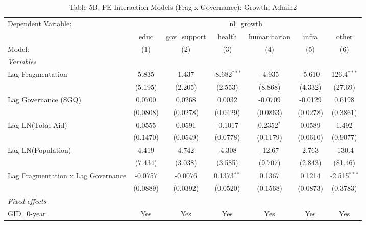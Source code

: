 \begin{table}[H]
   \caption{Table 5B. FE Interaction Models (Frag x Governance): Growth, Admin2}
   \centering
   \begin{tabular}{lcccccc}
      \tabularnewline \midrule \midrule
      Dependent Variable: & \multicolumn{6}{c}{nl\_growth}\\
                                         & educ     & gov\_support  & health         & humanitarian & infra    & other \\   
      Model:                             & (1)      & (2)           & (3)            & (4)          & (5)      & (6)\\  
      \midrule
      \emph{Variables}\\
      Lag Fragmentation                  & 5.835    & 1.437         & -8.682$^{***}$ & -4.935       & -5.610   & 126.4$^{***}$\\   
                                         & (5.195)  & (2.205)       & (2.553)        & (8.868)      & (4.332)  & (27.69)\\   
      Lag Governance (SGQ)               & 0.0700   & 0.0268        & 0.0032         & -0.0709      & -0.0129  & 0.6198\\   
                                         & (0.0808) & (0.0278)      & (0.0429)       & (0.0863)     & (0.0278) & (0.3861)\\   
      Lag LN(Total Aid)                  & 0.0555   & 0.0591        & -0.1017        & 0.2352$^{*}$ & 0.0589   & 1.492\\   
                                         & (0.1470) & (0.0549)      & (0.0778)       & (0.1179)     & (0.0610) & (0.9077)\\   
      Lag LN(Population)                 & 4.419    & 4.742         & -4.308         & -12.67       & 2.763    & -130.4\\   
                                         & (7.434)  & (3.038)       & (3.585)        & (9.707)      & (2.843)  & (81.46)\\   
      Lag Fragmentation x Lag Governance & -0.0757  & -0.0076       & 0.1373$^{**}$  & 0.1367       & 0.1214   & -2.515$^{***}$\\   
                                         & (0.0889) & (0.0392)      & (0.0520)       & (0.1568)     & (0.0873) & (0.3783)\\   
      \midrule
      \emph{Fixed-effects}\\
      GID\_0-year                        & Yes      & Yes           & Yes            & Yes          & Yes      & Yes\\  

\end{tabular}
\end{table}
